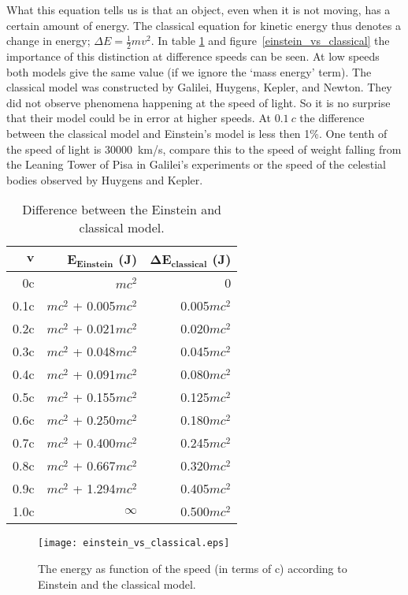 What this equation tells us is that an object, even when it is not moving, has a certain amount of energy. The classical equation for kinetic energy thus denotes a change in energy; $\Delta E=\frac{1}{2}mv^2$. In table \ref{tab:einstein1} and figure~\ref{einstein_vs_classical} the importance of this distinction at difference speeds can be seen. At low speeds both models give the same value (if we ignore the `mass energy' term). The classical model was constructed by Galilei, Huygens, Kepler, and Newton. They did not observe phenomena happening at the speed of light. So it is no surprise that their model could be in error at higher speeds. At $0.1~c$ the difference between the classical model and Einstein's model is less then 1\%. One tenth of the speed of light is 30000~km/s, compare this to the speed of weight falling from the Leaning Tower of Pisa in Galilei's experiments or the speed of the celestial bodies observed by Huygens and Kepler.
\begin{table}
\centering
\begin{tabular}{|r|r|r|}
\hline $\mathbf{v}$ & $\mathbf{E_{Einstein}}$ (J) & $\mathbf{\Delta E_{classical}}$ (J) \\ 
\hline 0c & $mc^2$ & 0 \\ 
\hline 0.1c & $mc^2$ + 0.005$mc^2$ & 0.005$mc^2$ \\ 
\hline 0.2c & $mc^2$ + 0.021$mc^2$ & 0.020$mc^2$ \\ 
\hline 0.3c & $mc^2$ + 0.048$mc^2$ & 0.045$mc^2$ \\ 
\hline 0.4c & $mc^2$ + 0.091$mc^2$ & 0.080$mc^2$ \\ 
\hline 0.5c & $mc^2$ + 0.155$mc^2$ & 0.125$mc^2$ \\ 
\hline 0.6c & $mc^2$ + 0.250$mc^2$ & 0.180$mc^2$ \\ 
\hline 0.7c & $mc^2$ + 0.400$mc^2$ & 0.245$mc^2$ \\ 
\hline 0.8c & $mc^2$ + 0.667$mc^2$ & 0.320$mc^2$ \\ 
\hline 0.9c & $mc^2$ + 1.294$mc^2$ & 0.405$mc^2$ \\ 
\hline 1.0c & $\infty$ & 0.500$mc^2$ \\ 
\hline 
\end{tabular}
\caption{Difference between the Einstein and classical model.}\label{tab:einstein1}
\end{table}

\begin{figure}\begin{center}
\texttt{[image: einstein\_vs\_classical.eps]}
\caption{The energy as function of the speed (in terms of c) according to Einstein and the classical model.}\label{fig:einstein_vs_classica}
\end{center}\end{figure}

